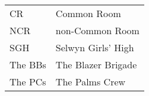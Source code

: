 \begin{tabular}{ll}
CR & Common Room     \\
NCR & non-Common Room        \\
SGH & Selwyn Girls' High     \\
The BBs &  The Blazer Brigade \\
The PCs & The Palms Crew  \\
\end{tabular}